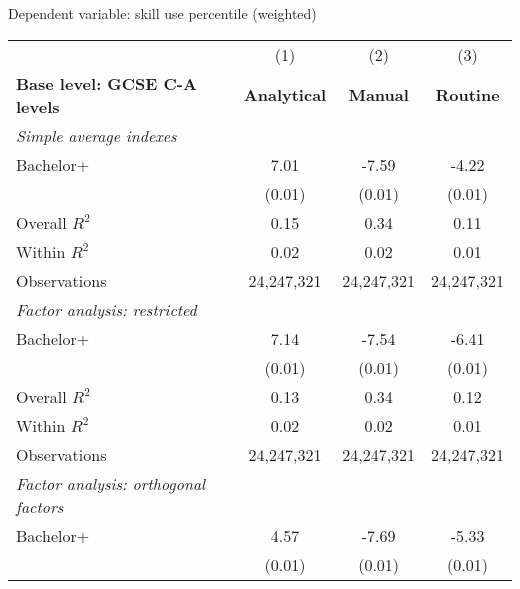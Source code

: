 \begin{center}
\begin{threeparttable}[!h]
\caption{Dependent variable: skill use percentile (weighted)}
\label{tab:skillRegs}
\begin{tabular}{lccc}
\toprule
\toprule
&\multicolumn{1}{c}{(1)}&\multicolumn{1}{c}{(2)}&\multicolumn{1}{c}{(3)} \\
\textbf{Base level: GCSE C-A levels}&\multicolumn{1}{c}{\textbf{Analytical}}&\multicolumn{1}{c}{\textbf{Manual}}&\multicolumn{1}{c}{\textbf{Routine}} \\
\midrule
\textit{Simple average indexes}\vspace{1mm} \\ 
\hspace{3mm}Bachelor+&        7.01\sym{***}&       -7.59\sym{***}&       -4.22\sym{***}\\
                    &      (0.01)         &      (0.01)         &      (0.01)         \\
\midrule Overall $ R^2$&        0.15         &        0.34         &        0.11         \\
Within $ R^2$       &        0.02         &        0.02         &        0.01         \\
Observations        &  24,247,321         &  24,247,321         &  24,247,321         \\
\midrule \vspace{1mm}\textit{Factor analysis: restricted} \\ 
\hspace{3mm}Bachelor+&        7.14\sym{***}&       -7.54\sym{***}&       -6.41\sym{***}\\
                    &      (0.01)         &      (0.01)         &      (0.01)         \\
\midrule Overall $ R^2$&        0.13         &        0.34         &        0.12         \\
Within $ R^2$       &        0.02         &        0.02         &        0.01         \\
Observations        &  24,247,321         &  24,247,321         &  24,247,321         \\
\midrule \vspace{1mm}\textit{Factor analysis: orthogonal factors} \\ 
\hspace{3mm}Bachelor+&        4.57\sym{***}&       -7.69\sym{***}&       -5.33\sym{***}\\
                    &      (0.01)         &      (0.01)         &      (0.01)         \\

\end{tabular}
\end{threeparttable}
\end{center}
